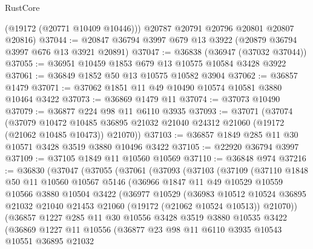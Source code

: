 \begin{lexlean}{RustCore}
\begin{coremodule}
        (@19172 (@20771 @10409 @10446)))
      @20787
      @20791
      @20796
      @20801
      @20807
      @20816)
@37044 := @20847 @36794 @3997 @679 @13 @3922 (@20879 @36794 @3997 @676 @13 @3921 @20891)
@37047 := @36838 (@36947 (@37032 @37044))
@37055 := @36951 @10459 @1853 @679 @13 @10575 @10584 @3428 @3922
@37061 := @36849 @1852 @50 @13 @10575 @10582 @3904
@37062 := @36857 @1479
@37071 := @37062 @1851 @11 @49 @10490 @10574 @10581 @3880 @10464 @3422
@37073 := @36869 @1479 @11
@37074 := @37073 @10490
@37079 := @36877 @224 @98 @11 @6110 @3935
@37093 := @37071
    (@37074
      (@37079
        @10472
        @10485
        @36895
        @21032
        @21040
        @24312
        @21060
        (@19172 (@21062 @10485 @10473))
        @21070))
@37103 := @36857 @1849 @285 @11 @30 @10571 @3428 @3519 @3880 @10496 @3422
@37105 := @22920 @36794 @3997
@37109 := @37105 @1849 @11 @10560 @10569
@37110 := @36848 @974
@37216 := @36830
    (@37047
      (@37055
        (@37061
          (@37093
            (@37103
              (@37109
                (@37110
                  @1848
                  @50
                  @11
                  @10560
                  @10567
                  @5146
                  (@36966
                    @1847
                    @11
                    @49
                    @10529
                    @10559
                    @10566
                    @3880
                    @10504
                    @3422
                    (@36977
                      @10529
                      (@36983
                        @10512
                        @10524
                        @36895
                        @21032
                        @21040
                        @21453
                        @21060
                        (@19172 (@21062 @10524 @10513))
                        @21070))
                    (@36857
                      @1227
                      @285
                      @11
                      @30
                      @10556
                      @3428
                      @3519
                      @3880
                      @10535
                      @3422
                      (@36869
                        @1227
                        @11
                        @10556
                        (@36877
                          @23
                          @98
                          @11
                          @6110
                          @3935
                          @10543
                          @10551
                          @36895
                          @21032

\end{coremodule}
\end{lexlean}
